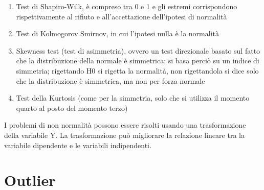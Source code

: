 \documentclass[a4page, 11pt]{article}
\begin{document}
\begin{enumerate}[noitemsep]
\item Test di Shapiro-Wilk, è compreso tra 0 e 1 e gli estremi corrispondono rispettivamente al rifiuto e all’accettazione dell’ipotesi di normalità
\item Test di Kolmogorov Smirnov, in cui l’ipotesi nulla è la normalità
\item Skewness test (test di asimmetria), ovvero un test direzionale basato sul fatto che la distribuzione della normale è simmetrica; si basa perciò su un indice di simmetria; rigettando H0 si rigetta la normalità, non rigettandola si dice solo che la distribuzione è simmetrica, ma non per forza normale
\item Test della Kurtosis (come per la simmetria, solo che si utilizza il momento quarto al posto del momento terzo)
\end{enumerate}
I problemi di non normalità possono essere risolti usando una trasformazione della variabile Y. La trasformazione può migliorare la relazione lineare tra la variabile dipendente e le variabili indipendenti.

\section{Outlier}
\end{document}
